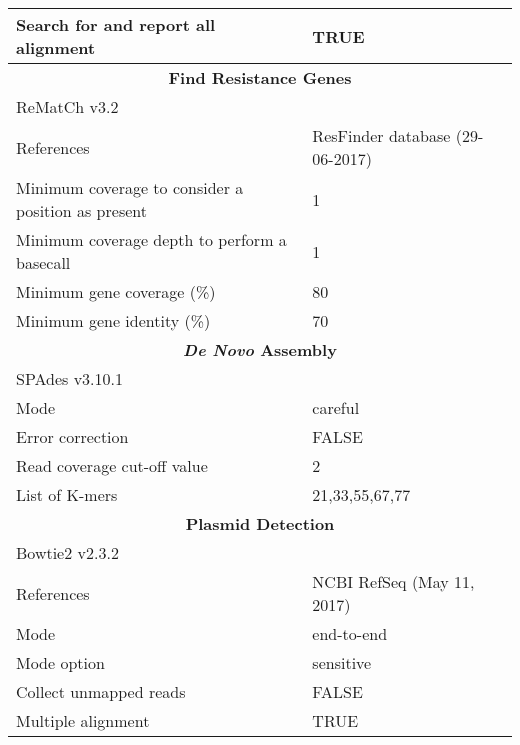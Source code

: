 \begin{table}[h!]
{\begin{tabular}{ll}
Search for and report all alignment                & TRUE                               \\
\midrule
\multicolumn{2}{c}{\textbf{Find Resistance Genes}}                                               \\\midrule
ReMatCh v3.2                                       &                                    \\
References                                         & ResFinder database (29-06-2017)    \\
Minimum coverage to consider a position as present & 1                                  \\
Minimum coverage depth to perform a basecall       & 1                                  \\
Minimum gene coverage (\%)                         & 80                                 \\
Minimum gene identity (\%)                         & 70                                 \\
\midrule
\multicolumn{2}{c}{\textbf{\textit{De Novo} Assembly}}                                                    \\\midrule
SPAdes v3.10.1                                     &                                    \\
Mode                                               & careful                            \\
Error correction                                   & FALSE                              \\
Read coverage cut-off value                        & 2                                  \\
List of K-mers                                     & 21,33,55,67,77                     \\
\midrule
\multicolumn{2}{c}{\textbf{Plasmid Detection}}                                                   \\\midrule
Bowtie2 v2.3.2                                     &                                    \\
References                                         & NCBI RefSeq (May 11, 2017)         \\
Mode                                               & end-to-end                         \\
Mode option                                        & sensitive                          \\
Collect unmapped reads                             & FALSE                              \\
Multiple alignment                                 & TRUE \\
\midrule
\end{tabular}%
}
\end{table}